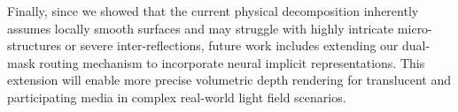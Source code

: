 \documentclass[lettersize,journal]{IEEEtran}
\begin{document}
Finally, since we showed that the current physical decomposition inherently assumes locally smooth surfaces and may struggle with highly intricate micro-structures or severe inter-reflections, future work includes extending our dual-mask routing mechanism to incorporate neural implicit representations. This extension will enable more precise volumetric depth rendering for translucent and participating media in complex real-world light field scenarios.



\end{document}
